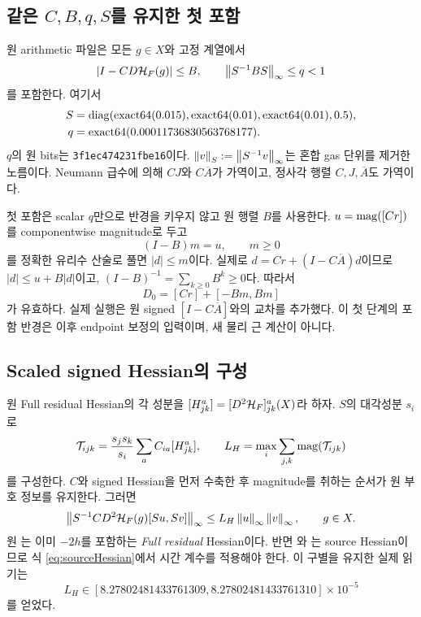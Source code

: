\subsection{같은 \texorpdfstring{$C,B,q,S$}{C,B,q,S}를 유지한 첫 포함}
원 arithmetic 파일은 모든 $g\in X$와 고정 계열에서
\begin{equation}
|I-CD\mathcal H_F(g)|\le B,\qquad
\left\lVert S^{-1}BS\right\rVert_\infty\le q<1
\label{eq:contract}
\end{equation}
를 포함한다. 여기서
\begin{align}
S&=\operatorname{diag}(\operatorname{exact64}(0.015),\operatorname{exact64}(0.01),\operatorname{exact64}(0.01),0.5),\notag\\
q&=\operatorname{exact64}(0.00011736830563768177).
\label{eq:Sq}
\end{align}
$q$의 원 bits는 \texttt{3f1ec474231fbe16}이다. $\left\lVert v\right\rVert_S:=\left\lVert S^{-1}v\right\rVert_\infty$는 혼합 gas 단위를 제거한 노름이다. Neumann 급수에 의해 $CJ$와 $C\overline A$가 가역이고, 정사각 행렬 $C,J,\overline A$도 가역이다.\cite{phys14,Rump2010}

첫 포함은 scalar $q$만으로 반경을 키우지 않고 원 행렬 $B$를 사용한다. $u=\operatorname{mag}([Cr])$를 componentwise magnitude로 두고
\begin{equation}
(I-B)m=u,\qquad m\ge0
\label{eq:majorsolve}
\end{equation}
를 정확한 유리수 산술로 풀면 $|d|\le m$이다. 실제로 $d=Cr+(I-C\overline A)d$이므로 $|d|\le u+B|d|$이고, $(I-B)^{-1}=\sum_{k\ge0}B^k\ge0$다. 따라서
\begin{equation}
D_0=[Cr]+[-Bm,Bm]
\label{eq:D0}
\end{equation}
가 유효하다. 실제 실행은 원 signed $[I-C\overline A]$와의 교차를 추가했다. 이 첫 단계의 포함 반경은 이후 endpoint 보정의 입력이며, 새 물리 근 계산이 아니다.

\subsection{Scaled signed Hessian의 구성}
원 Full residual Hessian의 각 성분을 $[H^a_{jk}]=[D^2\mathcal H_F]^a_{jk}(X)$라 하자. $S$의 대각성분 $s_i$로
\begin{equation}
\mathcal T_{ijk}=\frac{s_js_k}{s_i}\sum_aC_{ia}[H^a_{jk}],\qquad
L_H=\max_i\sum_{j,k}\operatorname{mag}(\mathcal T_{ijk})
\label{eq:LH}
\end{equation}
를 구성한다. $C$와 signed Hessian을 먼저 수축한 후 magnitude를 취하는 순서가 원 부호 정보를 유지한다. 그러면
\begin{equation}
\left\lVert S^{-1}CD^2\mathcal H_F(g)[Su,Sv]\right\rVert_\infty
\le L_H\left\lVert u\right\rVert_\infty\left\lVert v\right\rVert_\infty,\qquad g\in X.
\label{eq:hbound}
\end{equation}
원 는 이미 $-2h$를 포함하는 \emph{Full residual} Hessian이다. 반면 와 는 source Hessian이므로 식 \eqref{eq:sourceHessian}에서 시간 계수를 적용해야 한다. 이 구별을 유지한 실제 읽기는
\begin{equation}
L_H\in[8.27802481433761309,8.27802481433761310]\times10^{-5}
\label{eq:LHvalue}
\end{equation}
를 얻었다.\cite{endpoint16}

